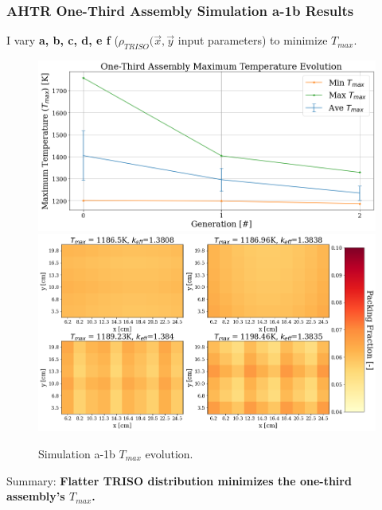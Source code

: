 \begin{frame}
    \frametitle{AHTR One-Third Assembly Simulation a-1b Results}
    I vary \textbf{a, b, c, d, e f} ($\rho_{TRISO}(\vec{x}, \vec{y}$ input parameters)
    to minimize $T_{max}$. 
    \begin{figure}
        \includegraphics[width=0.49\linewidth]{../docs/figures/assem-obj-1-temp-evol.png} 
        \includegraphics[width=0.49\linewidth]{../docs/figures/assem-obj-1-temp-final.png}
        \caption{Simulation a-1b $T_{max}$ evolution.}
    \end{figure}
    Summary: \textbf{Flatter TRISO distribution minimizes the one-third assembly's 
    $T_{max}$.}
\end{frame}

